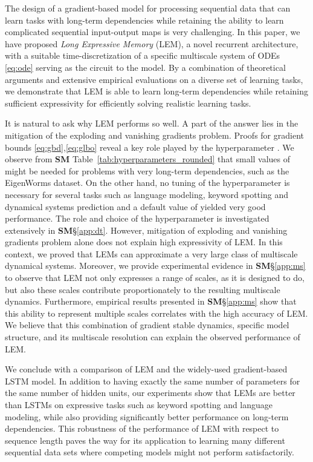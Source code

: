 \documentclass{article} \usepackage{iclr2022_conference,times}
\newcommand{\Tref}[1]{Table~\ref{#1}}
\begin{document}
The design of a gradient-based model for processing sequential data that can learn tasks with long-term dependencies while retaining the ability to learn complicated sequential input-output maps is very challenging. 
In this paper, we have proposed \emph{Long Expressive Memory} (LEM), a novel recurrent architecture, with a suitable time-discretization of a specific multiscale system of ODEs \eqref{eq:ode} serving as the circuit to the model. By a combination of theoretical arguments and extensive empirical evaluations on a diverse set of learning tasks, we demonstrate that LEM is able to learn long-term dependencies while retaining sufficient expressivity for efficiently solving realistic learning tasks. 

It is natural to ask why LEM performs so well. A part of the answer lies in the mitigation of the exploding and vanishing gradients problem. Proofs for gradient bounds \eqref{eq:gbd},\eqref{eq:glbo} reveal a key role played by the hyperparameter . We observe from {\bf SM} \Tref{tab:hyperparameters_rounded} that small values of  might be needed for problems with very long-term dependencies, such as the EigenWorms dataset. On the other hand, no tuning of the hyperparameter  is necessary for several tasks such as language modeling, keyword spotting and dynamical systems prediction and a default value of  yielded very good performance. The role and choice of the hyperparameter  is investigated extensively in {\bf SM}\S\ref{app:dt}. However, mitigation of exploding and vanishing gradients problem alone does not explain high expressivity of LEM. In this context, we proved that LEMs can approximate a very large class of multiscale dynamical systems. Moreover, we provide experimental evidence in {\bf SM}\S\ref{app:ms} to observe that LEM not only expresses a range of scales, as it is designed to do, but also these scales contribute proportionately to the resulting multiscale dynamics. Furthermore, empirical results presented in {\bf SM}\S\ref{app:ms} show that this ability to represent multiple scales correlates with the high accuracy of LEM. We believe that this combination of gradient stable dynamics, specific model structure, and its multiscale resolution can explain the observed performance of LEM. 

We conclude with a comparison of LEM and the widely-used gradient-based LSTM model. 
In addition to having exactly the same number of parameters for the same number of hidden units, our experiments show that LEMs are better than LSTMs on expressive tasks such as keyword spotting and language modeling, while also providing significantly better performance on long-term dependencies. This robustness of the performance of LEM with respect to sequence length paves the way for its application to learning many different sequential data sets where competing models might not perform satisfactorily.
\end{document}
